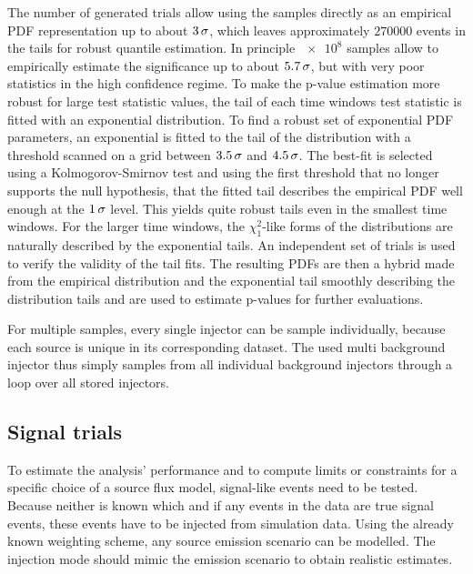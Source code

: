 The number of generated trials allow using the samples directly as an empirical PDF representation up to about $\num{3}\,\sigma$, which leaves approximately $\num{270000}$ events in the tails for robust quantile estimation.
In principle $\num{e8}$ samples allow to empirically estimate the significance up to about $\num{5.7}\,\sigma$, but with very poor statistics in the high confidence regime.
To make the p-value estimation more robust for large test statistic values, the tail of each time windows test statistic is fitted with an exponential distribution.
To find a robust set of exponential PDF parameters, an exponential is fitted to the tail of the distribution with a threshold scanned on a grid between $\num{3.5}\,\sigma$ and $\num{4.5}\,\sigma$.
The best-fit is selected using a Kolmogorov-Smirnov test \cite{Horn:1977KSTest} and using the first threshold that no longer supports the null hypothesis, that the fitted tail describes the empirical PDF well enough at the $\num{1}\,\sigma$ level.
This yields quite robust tails even in the smallest time windows.
For the larger time windows, the $\chi^2_1$-like forms of the distributions are naturally described by the exponential tails.
An independent set of trials is used to verify the validity of the tail fits.
The resulting PDFs are then a hybrid made from the empirical distribution and the exponential tail smoothly describing the distribution tails and are used to estimate p-values for further evaluations.

For multiple samples, every single injector can be sample individually, because each source is unique in its corresponding dataset.
The used multi background injector thus simply samples from all individual background injectors through a loop over all stored injectors.


\subsection*{Signal trials}
To estimate the analysis' performance and to compute limits or constraints for a specific choice of a source flux model, signal-like events need to be tested.
Because neither is known which and if any events in the data are true signal events, these events have to be injected from simulation data.
Using the already known weighting scheme, any source emission scenario can be modelled.
The injection mode should mimic the emission scenario to obtain realistic estimates.

